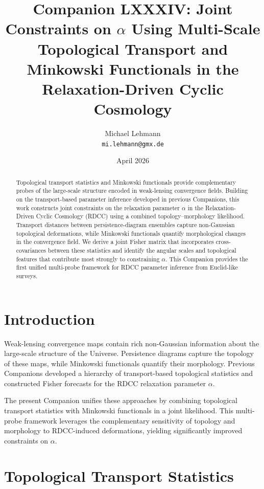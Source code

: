 \documentclass[11pt,a4paper]{article}
\title{\textbf{Companion LXXXIV: Joint Constraints on $\alpha$ Using Multi-Scale Topological Transport and Minkowski Functionals in the Relaxation-Driven Cyclic Cosmology}}
\author{Michael Lehmann \\ \texttt{mi.lehmann@gmx.de}}
\date{April 2026}
\begin{document}
\maketitle

\begin{abstract}
Topological transport statistics and Minkowski functionals provide complementary 
probes of the large-scale structure encoded in weak-lensing convergence fields. 
Building on the transport-based parameter inference developed in previous 
Companions, this work constructs joint constraints on the relaxation parameter 
$\alpha$ in the Relaxation-Driven Cyclic Cosmology (RDCC) using a combined 
topology–morphology likelihood. Transport distances between persistence-diagram 
ensembles capture non-Gaussian topological deformations, while Minkowski 
functionals quantify morphological changes in the convergence field. We derive a 
joint Fisher matrix that incorporates cross-covariances between these statistics 
and identify the angular scales and topological features that contribute most 
strongly to constraining $\alpha$. This Companion provides the first unified 
multi-probe framework for RDCC parameter inference from Euclid-like surveys.
\end{abstract}
\section{Introduction}

Weak-lensing convergence maps contain rich non-Gaussian information about the 
large-scale structure of the Universe. Persistence diagrams capture the topology 
of these maps, while Minkowski functionals quantify their morphology. Previous 
Companions developed a hierarchy of transport-based topological statistics and 
constructed Fisher forecasts for the RDCC relaxation parameter $\alpha$.

The present Companion unifies these approaches by combining topological transport 
statistics with Minkowski functionals in a joint likelihood. This multi-probe 
framework leverages the complementary sensitivity of topology and morphology to 
RDCC-induced deformations, yielding significantly improved constraints on 
$\alpha$.
\section{Topological Transport Statistics}
\end{document}
